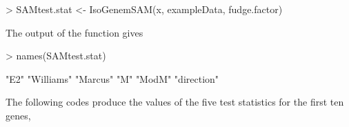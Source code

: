 \documentclass[10pt]{mybook4}
\begin{document}
\begin{Schunk}
\begin{Sinput}
> SAMtest.stat <- IsoGenemSAM(x, exampleData, fudge.factor)
\end{Sinput}
\end{Schunk}

The output of the function gives

\begin{Schunk}
\begin{Sinput}
> names(SAMtest.stat)
\end{Sinput}
\begin{Soutput}
[1] "E2"        "Williams"  "Marcus"    "M"         "ModM"      "direction"
\end{Soutput}
\end{Schunk}

The following codes produce the values of the five test statistics for the first ten genes,
\end{document}
